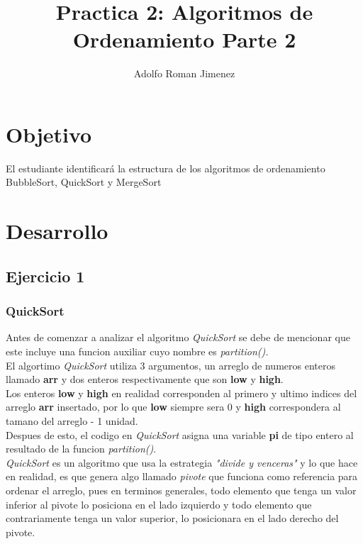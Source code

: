\documentclass{article}
\title{Practica 2: Algoritmos de Ordenamiento Parte 2}
\author{Adolfo Roman Jimenez}
\begin{document}
	\maketitle
	
	\section{Objetivo}
	El estudiante identificará la estructura de los algoritmos de ordenamiento BubbleSort, QuickSort y	MergeSort
	
	\section{Desarrollo}
	
		\subsection{Ejercicio 1}
		
			\subsubsection{QuickSort}
			
				Antes de comenzar a analizar el algoritmo \emph{QuickSort} se debe de mencionar que este incluye una funcion auxiliar cuyo nombre es \emph{partition().}\\
				
				El algortimo \emph{QuickSort} utiliza 3 argumentos, un arreglo de numeros enteros llamado \textbf{arr} y dos enteros respectivamente que son \textbf{low} y \textbf{high}.\\
				
				Los enteros \textbf{low} y \textbf{high} en realidad corresponden al primero y ultimo indices del arreglo \textbf{arr} insertado, por lo que \textbf{low} siempre sera 0 y \textbf{high} correspondera al tamano del arreglo - 1 unidad.\\
				
				Despues de esto, el codigo en \emph{QuickSort} asigna una variable \textbf{pi} de tipo entero al resultado de la funcion \emph{partition()}.\\
				
				\emph{QuickSort} es un algoritmo que usa la estrategia \emph{"divide y venceras"} y lo que hace en realidad, es que genera algo llamado \emph{pivote} que funciona como referencia para ordenar el arreglo, pues en terminos generales, todo elemento que tenga un valor inferior al pivote lo posiciona en el lado izquierdo y todo elemento que contrariamente tenga un valor superior, lo posicionara en el lado derecho del pivote.\\
				
\end{document}
